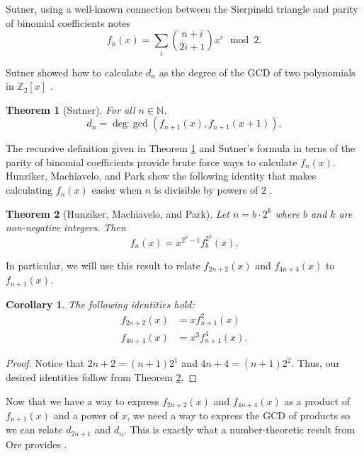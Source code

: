 \documentclass[a4paper]{article}
\newtheorem{theorem}{Theorem}[section]
\newtheorem{corollary}{Corollary}[theorem]
\newcommand{\Z}{\mathbb{Z}}
\newcommand{\N}{\mathbb{N}}
\begin{document}
	Sutner, using a well-known connection between the Sierpinski triangle and parity of binomial coefficients notes \cite{Sutner96sigma-automataand}
	\begin{equation*}
		f_n(x) = \sum_{i}{\binom{n+i}{2i+1}x^i \mod 2}.
	\end{equation*}

	Sutner showed how to calculate $d_n$ as the degree of the GCD of two polynomials in $\Z_2[x]$ \cite{Sutner96sigma-automataand}.
	\begin{theorem}[Sutner]\label{Sutner_gcd}
		For all $n \in \N$.
		\begin{equation*}
			d_n = \deg{\gcd\left(f_{n+1}(x), f_{n+1}(x+1)\right)}.
		\end{equation*}
	\end{theorem}
	
	The recursive definition given in Theorem \ref{Sutner_gcd} and Sutner's formula in terns of the parity of binomial coefficients provide brute force ways to calculate $f_n(x)$.
	Hunziker, Machiavelo, and Park show the following identity that makes calculating $f_n(x)$ easier when $n$ is divisible by powers of 2 \cite{HUNZIKER2004465}.
	
	\begin{theorem}[Hunziker, Machiavelo, and Park]\label{HMP_identity}
		Let $n = b\cdot2^{k}$ where $b$ and $k$ are non-negative integers.
		Then
		\begin{equation*}
			f_n(x) = x^{2^{k}-1} f_{b}^{2^{k}}(x).
		\end{equation*}
	\end{theorem}

	In particular, we will use this result to relate $f_{2n+2}(x)$ and $f_{4n+4}(x)$ to $f_{n+1}(x)$.
	\begin{corollary}\label{cor1}
		The following identities hold:
		\begin{align*}
			f_{2n+2}(x) &= xf_{n+1}^2(x) \\
			f_{4n+4}(x) &= x^3f_{n+1}^4(x).
		\end{align*}
	\end{corollary}
	\begin{proof}
		Notice that $2n+2 = (n+1)2^1$ and $4n+4 = (n+1)2^{2}$.
		Thus, our desired identities follow from Theorem \ref{HMP_identity}.
	\end{proof}

	Now that we have a way to express $f_{2n+2}(x)$ and $f_{4n+4}(x)$ as a product of $f_{n+1}(x)$ and a power of $x$, we need a way to express the GCD of products so we can relate $d_{2n+1}$ and $d_n$.
	This is exactly what a number-theoretic result from Ore provides \cite{ore_number_theory}.
	
\end{document}
